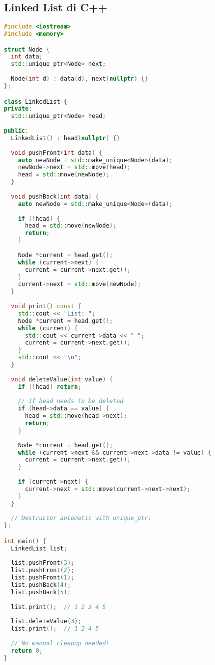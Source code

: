 \documentclass[../main.tex]{subfiles}
\begin{document}
\subsection{Linked List di C++}

\begin{lstlisting}[language=C++, caption={Linked list dengan smart pointers di C++}]
#include <iostream>
#include <memory>

struct Node {
  int data;
  std::unique_ptr<Node> next;
  
  Node(int d) : data(d), next(nullptr) {}
};

class LinkedList {
private:
  std::unique_ptr<Node> head;
  
public:
  LinkedList() : head(nullptr) {}
  
  void pushFront(int data) {
    auto newNode = std::make_unique<Node>(data);
    newNode->next = std::move(head);
    head = std::move(newNode);
  }
  
  void pushBack(int data) {
    auto newNode = std::make_unique<Node>(data);
    
    if (!head) {
      head = std::move(newNode);
      return;
    }
    
    Node *current = head.get();
    while (current->next) {
      current = current->next.get();
    }
    current->next = std::move(newNode);
  }
  
  void print() const {
    std::cout << "List: ";
    Node *current = head.get();
    while (current) {
      std::cout << current->data << " ";
      current = current->next.get();
    }
    std::cout << "\n";
  }
  
  void deleteValue(int value) {
    if (!head) return;
    
    // If head needs to be deleted
    if (head->data == value) {
      head = std::move(head->next);
      return;
    }
    
    Node *current = head.get();
    while (current->next && current->next->data != value) {
      current = current->next.get();
    }
    
    if (current->next) {
      current->next = std::move(current->next->next);
    }
  }
  
  // Destructor automatic with unique_ptr!
};

int main() {
  LinkedList list;
  
  list.pushFront(3);
  list.pushFront(2);
  list.pushFront(1);
  list.pushBack(4);
  list.pushBack(5);
  
  list.print();  // 1 2 3 4 5
  
  list.deleteValue(3);
  list.print();  // 1 2 4 5
  
  // No manual cleanup needed!
  return 0;
}
\end{lstlisting}
\end{document}
